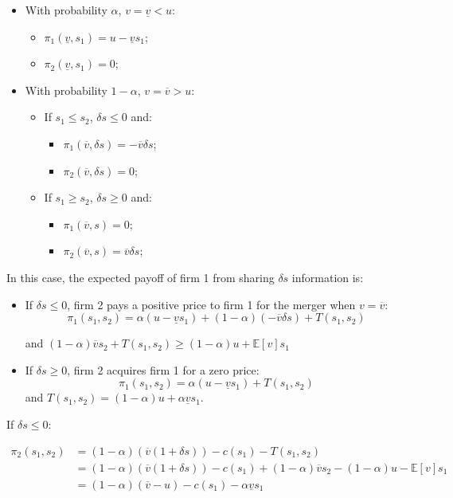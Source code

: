 \documentclass[a4paper,leqno]{article}%
\newcommand{\E}{\mathbb E}
\renewcommand{\a}{\alpha}
\newcommand{\uv}{\underline{v}}
\newcommand{\ov}{\overline{v}}
\begin{document}
\begin{itemize}
    \item With probability $\a$, $v=\uv<u$:
\begin{itemize}
    \item $\pi_1(\uv,s_1)=u-\uv s_1$;
    \item $\pi_2(\uv,s_1)=0$;
\end{itemize}
    \item With probability $1-\a$, $v=\ov>u$:
\begin{itemize}
    \item If $ s_1\leq s_2$, $\delta s\leq 0$ and:
\begin{itemize}
    \item $\pi_1(\ov,\delta s)=-\ov \delta s$;
    \item $\pi_2(\ov,\delta s)=0$;
\end{itemize}    
    \item If $s_1\geq s_2$, $\delta s\geq 0$ and:
\begin{itemize}
    \item $\pi_1(\ov,s)=0$;
    \item $\pi_2(\ov,s)=\ov \delta s$;
\end{itemize}
\end{itemize}
\end{itemize}

In this case, the expected payoff of firm 1 from sharing $\delta s$ information is:

\begin{itemize}
    \item If $\delta s\leq 0$, firm 2 pays a positive price to firm 1 for the merger when $v=\ov$:
    $$\pi_1(s_1,s_2)=\a(u-\uv s_1)+(1-\a)(-\ov \delta s)+T(s_1,s_2)$$
    
    and $(1-\a)\ov s_2+T(s_1,s_2) \geq (1-\a)u+\E[v]s_1$
    \item If $\delta s\geq 0$, firm 2 acquires firm 1 for a zero price:
    $$\pi_1(s_1,s_2)=\a(u-\uv s_1)+T(s_1,s_2)$$
    and $T(s_1,s_2)=(1-\a)u+\a \uv s_1$.
\end{itemize}


If $\delta s\leq 0$:

\begin{equation}
    \begin{aligned}
      \pi_2(s_1,s_2)&=(1-\a)(\ov(1+\delta s))-c(s_1)-T(s_1,s_2)\\
                    &=(1-\a)(\ov(1+\delta s))-c(s_1)+(1-\a)\ov s_2-(1-\a)u-\E[v]s_1\\
                    &=(1-\a)(\ov-u)-c(s_1)-\a\uv s_1\\
    \end{aligned}
\end{equation}
\end{document}
